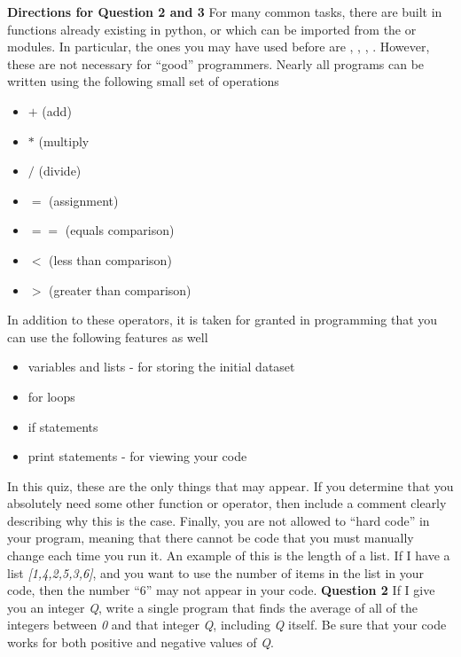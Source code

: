 \documentclass[12pt]{article}
\begin{document}
\newpage
\textbf{Directions for Question 2 and 3} 
\newline
For many common tasks, there are built in functions already existing in python, or which can be imported from the \small{} or \small{} modules.  In particular, the ones you may have used before are \small{}, \small{}, \small{}, \small{}.  However, these are not necessary for ``good'' programmers.  Nearly all programs can be written using the following small set of operations 
\begin{itemize}[noitemsep]
\item $+$ (add)
\item $*$ (multiply
\item $/$ (divide)
\item $=$ (assignment)
\item $==$ (equals comparison)
\item $<$ (less than comparison)
\item $>$ (greater than comparison)
\end{itemize}
In addition to these operators, it is taken for granted in programming that you can use the following features as well
\begin{itemize}[noitemsep]
\item variables and lists - for storing the initial dataset
\item for loops
\item if statements
\item print statements - for viewing your code
\end{itemize}
In this quiz, these are the only things that may appear.   If you determine that you absolutely need some other function or operator, then include a comment clearly describing why this is the case.
\newline
Finally, you are not allowed to ``hard code'' in your program, meaning that there cannot be code that you must manually change each time you run it.  An example of this is the length of a list.  If I have a list \textit{[1,4,2,5,3,6]}, and you want to use the number of items in the list in your code, then the number ``6'' may not appear in your code.  
\newline
\newline
\textbf{Question 2}
\newline
If I give you an integer \textit{Q}, write a single program that finds the average of all of the integers between \textit{0} and that integer \textit{Q}, including \textit{Q} itself.  Be sure that your code works for both positive and negative values of \textit{Q}.
\end{document}
